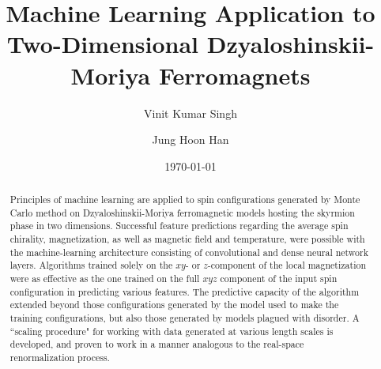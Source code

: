 \documentclass[reprint,amsmath,amssymb,aps,showpacs,superscriptaddress,prl]{revtex4-1}
\begin{document}
%
\title{Machine Learning Application to Two-Dimensional Dzyaloshinskii-Moriya Ferromagnets}

\author{Vinit Kumar Singh}
\author{Jung Hoon Han}
\date{\today}

\begin{abstract}
Principles of machine learning are applied to spin configurations generated by Monte Carlo method on Dzyaloshinskii-Moriya ferromagnetic models hosting the skyrmion phase in two dimensions. Successful feature predictions regarding the average spin chirality, magnetization, as well as magnetic field and temperature, were possible with the machine-learning architecture consisting of convolutional and dense neural network layers. Algorithms trained solely on the $xy$- or $z$-component of the local magnetization were as effective as the one trained on the full $xyz$ component of the input spin configuration in predicting various features. The predictive capacity of the algorithm extended beyond those configurations generated by the model used to make the training configurations, but also those generated by models plagued with disorder. A ``scaling procedure" for working with data generated at various length scales is developed, and proven to work in a manner analogous to the real-space renormalization process. 
\end{abstract}
\maketitle
\end{document}
